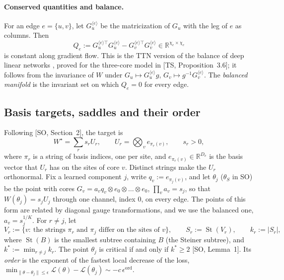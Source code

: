 \documentclass[11pt]{article}
\newcommand{\R}{\mathbb{R}}
\newcommand{\norm}[1]{\lVert #1\rVert}
\newcommand{\St}{\operatorname{St}}
\newcommand{\ord}{\operatorname{ord}}
\newcommand{\TS}{\textsf{TS}}
\newcommand{\SO}{\textsf{SO}}
\newcommand{\ts}[1]{[\TS, #1]}
\newcommand{\so}[1]{[\SO, #1]}
\theoremstyle{definition}
\numberwithin{equation}{section}
\begin{document}
\paragraph{Conserved quantities and balance.} For an edge $e=\{u,v\}$, let $G_u^{\langle e\rangle}$ be the matricization of $G_u$ with the leg of $e$ as columns. Then
\begin{equation}\label{eq:Q}
Q_e:=G_u^{\langle e\rangle\top}G_u^{\langle e\rangle}-G_v^{\langle e\rangle\top}G_v^{\langle e\rangle}\in\R^{\chi_e\times\chi_e}
\end{equation}
is constant along gradient flow. This is the TTN version of the balance of deep linear networks \citep{du2018algorithmic}, proved for the three-core model in \ts{Proposition~3.6}; it follows from the invariance of $W$ under $G_u\mapsto G_u^{\langle e\rangle}g$, $G_v\mapsto g^{-1}G_v^{\langle e\rangle}$. The \emph{balanced manifold} is the invariant set on which $Q_e=0$ for every edge.

\subsection{Basis targets, saddles and their order}\label{sec:so-recap}

Following \so{Section~2}, the target is
\begin{equation}\label{eq:target}
W^\star=\sum_rs_rU_r,\qquad U_r=\bigotimes_ve_{\pi_r(v)},\qquad s_r>0,
\end{equation}
where $\pi_r$ is a string of basis indices, one per site, and $e_{\pi_r(v)}\in\R^{D_v}$ is the basis vector that $U_r$ has on the sites of core $v$. Distinct strings make the $U_r$ orthonormal. Fix a learned component $j$, write $q_v:=e_{\pi_j(v)}$, and let $\theta_j$ ($\theta_S$ in \SO) be the point with cores $G_v=a_vq_v\otimes e_0\otimes\dots\otimes e_0$, $\prod_va_v=s_j$, so that $W(\theta_j)=s_jU_j$ through one channel, index $0$, on every edge. The points of this form are related by diagonal gauge transformations, and we use the balanced one, $a_v=s_j^{1/K}$. For $r\neq j$, let
\begin{equation}\label{eq:Vr}
V_r:=\{v:\ \text{the strings }\pi_r\text{ and }\pi_j\text{ differ on the sites of }v\},\qquad S_r:=\St(V_r),\qquad k_r:=|S_r|,
\end{equation}
where $\St(B)$ is the smallest subtree containing $B$ (the Steiner subtree), and $k^*:=\min_{r\neq j}k_r$. The point $\theta_j$ is critical if and only if $k^*\ge2$ \so{Lemma~1}. Its \emph{order} is the exponent of the fastest local decrease of the loss, $\min_{\norm{\theta-\theta_j}\le\epsilon}\mathcal L(\theta)-\mathcal L(\theta_j)\sim-c\,\epsilon^{\ord}$.
\end{document}
